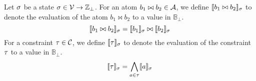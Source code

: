\begin{definition}
  Let $\sigma$ be a state $\sigma \in \mathcal{V} \rightarrow \mathbb{Z}_\bot$.
  For an atom $b_1 \bowtie b_2 \in \mathcal{A}$, we define $\llbracket b_1 \bowtie b_2 \rrbracket_{\sigma}$ to denote the evaluation of the atom $b_1 \bowtie b_2$ to a value in $\mathbb{B}_\bot$.
  \[ \llbracket b_1 \bowtie b_2 \rrbracket_{\sigma} = \llbracket b_1 \rrbracket_{\sigma} \bowtie \llbracket b_2 \rrbracket_{\sigma} \]
  For a constraint $\tau \in \mathcal{C}$, we define $\llbracket \tau \rrbracket_{\sigma}$ to denote the evaluation of the constraint $\tau$ to a value in $\mathbb{B}_\bot$.
  \[ \llbracket \tau \rrbracket_{\sigma} = \bigwedge_{a \in \tau} \llbracket a \rrbracket_{\sigma} \]
\end{definition}
